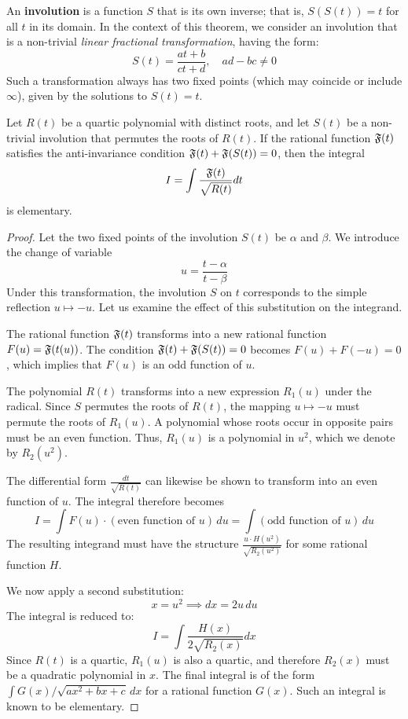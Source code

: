 \documentclass[11pt]{article}
\begin{document}
{
  \color{blue}
\medskip

\begin{definition}[Involution]
An \textbf{involution} is a function $S$ that is its own inverse; that is, $S(S(t)) = t$ for all $t$ in its domain. In the context of this theorem, we consider an involution that is a non-trivial \textit{linear fractional transformation}, having the form:
$$ S(t) = \frac{at+b}{ct+d}, \quad ad-bc \neq 0 $$
Such a transformation always has two fixed points (which may coincide or include $\infty$), given by the solutions to $S(t)=t$.
\end{definition}

\begin{theorem*}
Let $R(t)$ be a quartic polynomial with distinct roots, and let $S(t)$ be a non-trivial involution that permutes the roots of $R(t)$. If the rational function $\mathfrak{F}(t)$ satisfies the anti-invariance condition $\mathfrak{F}(t) + \mathfrak{F}(S(t)) = 0$, then the integral
$$ I = \int \frac{\mathfrak{F}(t)}{\sqrt{R(t)}} dt $$
is elementary.
\end{theorem*}

\begin{proof}
Let the two fixed points of the involution $S(t)$ be $\alpha$ and $\beta$. We introduce the change of variable
$$ u = \frac{t - \alpha}{t - \beta} $$
Under this transformation, the involution $S$ on $t$ corresponds to the simple reflection $u \mapsto -u$. Let us examine the effect of this substitution on the integrand.

The rational function $\mathfrak{F}(t)$ transforms into a new rational function $F(u) = \mathfrak{F}(t(u))$. The condition $\mathfrak{F}(t) + \mathfrak{F}(S(t)) = 0$ becomes $F(u) + F(-u) = 0$, which implies that $F(u)$ is an odd function of $u$.

The polynomial $R(t)$ transforms into a new expression $R_1(u)$ under the radical. Since $S$ permutes the roots of $R(t)$, the mapping $u \mapsto -u$ must permute the roots of $R_1(u)$. A polynomial whose roots occur in opposite pairs must be an even function. Thus, $R_1(u)$ is a polynomial in $u^2$, which we denote by $R_2(u^2)$.

The differential form $\frac{dt}{\sqrt{R(t)}}$ can likewise be shown to transform into an even function of $u$. The integral therefore becomes
$$ I = \int F(u) \cdot (\text{even function of } u) \, du = \int (\text{odd function of } u) \, du $$
The resulting integrand must have the structure $\frac{u \cdot H(u^2)}{\sqrt{R_2(u^2)}}$ for some rational function $H$.

We now apply a second substitution:
$$ x = u^2 \implies dx = 2u\,du $$
The integral is reduced to:
$$ I = \int \frac{H(x)}{2\sqrt{R_2(x)}} dx $$
Since $R(t)$ is a quartic, $R_1(u)$ is also a quartic, and therefore $R_2(x)$ must be a quadratic polynomial in $x$. The final integral is of the form $\int G(x) / \sqrt{ax^2+bx+c} \, dx$ for a rational function $G(x)$. Such an integral is known to be elementary.
\end{proof}
}
\medskip
\end{document}

